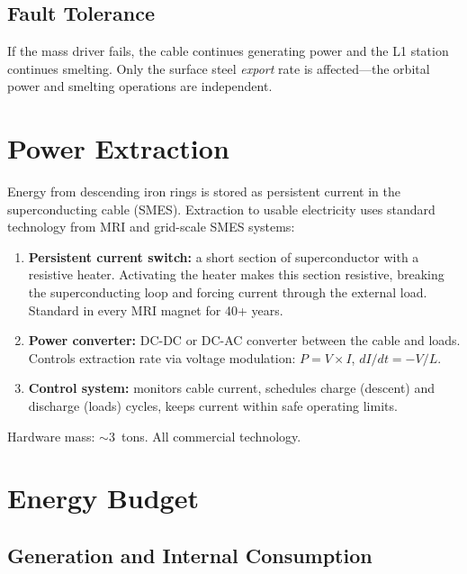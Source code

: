 \documentclass[12pt,letterpaper]{article}
\begin{document}
\subsection{Fault Tolerance}

If the mass driver fails, the cable continues generating power and the L1 station continues smelting. Only the surface steel \emph{export} rate is affected---the orbital power and smelting operations are independent.
\section{Power Extraction}

Energy from descending iron rings is stored as persistent current in the superconducting cable (SMES). Extraction to usable electricity uses standard technology from MRI and grid-scale SMES systems:

\begin{enumerate}[label=(\roman*)]
\item \textbf{Persistent current switch:} a short section of superconductor with a resistive heater. Activating the heater makes this section resistive, breaking the superconducting loop and forcing current through the external load. Standard in every MRI magnet for 40+ years.

\item \textbf{Power converter:} DC-DC or DC-AC converter between the cable and loads. Controls extraction rate via voltage modulation: $P = V \times I$, $dI/dt = -V/L$.

\item \textbf{Control system:} monitors cable current, schedules charge (descent) and discharge (loads) cycles, keeps current within safe operating limits.
\end{enumerate}

Hardware mass: $\sim$3~tons. All commercial technology.

\section{Energy Budget}

\subsection{Generation and Internal Consumption}
\end{document}
